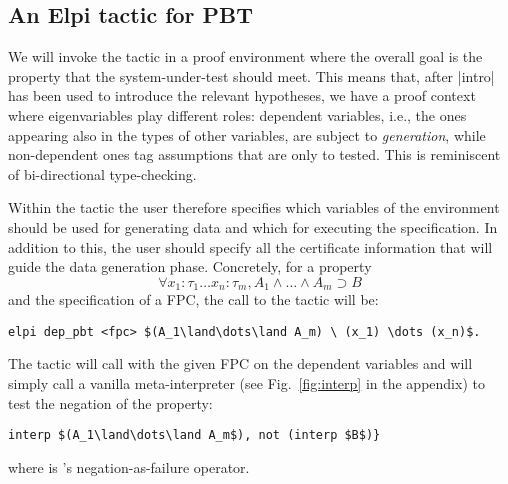\subsection{An Elpi tactic for PBT}
We will invoke the tactic in a proof environment where the overall
goal is %
the property that the system-under-test should meet. This means that,
after \lsti|intro| has been used to introduce the relevant hypotheses,
we have a proof
context %
where eigenvariables play different roles: dependent variables, i.e., the ones appearing also in the types of other variables, are
subject to \emph{generation}, while non-dependent ones tag assumptions that
are only to tested. This is reminiscent of bi-directional
type-checking. %

Within the tactic the user therefore
specifies which variables of the environment should be used for
generating data and which for executing the specification. In addition
to this, the user should specify all the certificate information that
will guide the data generation phase. %
Concretely, for a property
\[
\forall x_1 \colon \tau_1\dots x_n \colon \tau_m, A_1\land\dots\land A_m \supset B
\]
and the specification of a FPC, the call to the tactic will be:
\begin{lstlisting}
elpi dep_pbt <fpc> $(A_1\land\dots\land A_m) \ (x_1) \dots (x_n)$.
\end{lstlisting}
The tactic will call  with the given FPC on the dependent variables and will simply call a vanilla meta-interpreter (see Fig.~\ref{fig:interp} in the appendix) to test the negation of the property:
\begin{lstlisting}
interp $(A_1\land\dots\land A_m$), not (interp $B$)}
\end{lstlisting}
where  is \lP's negation-as-failure operator.

